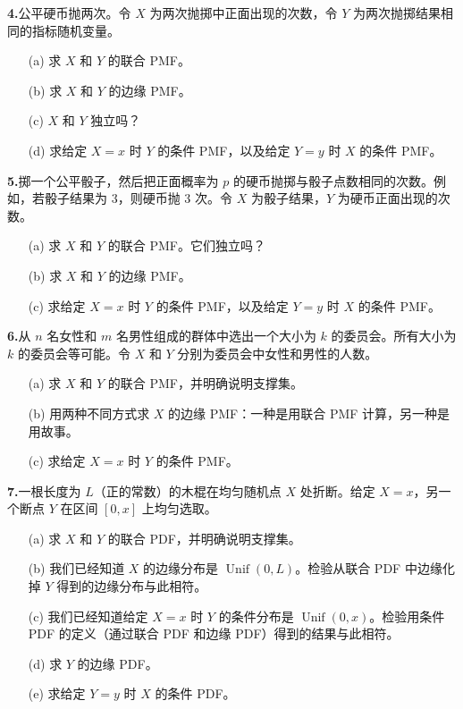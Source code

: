 \documentclass[UTF8, 12pt, fontset=fandol, oneside]{ctexart}
\begin{document}
\noindent\textbf{4.}\quad 公平硬币抛两次。令 $X$ 为两次抛掷中正面出现的次数，令 $Y$ 为两次抛掷结果相同的指标随机变量。
\begin{enumerate}
  \item[(a)] 求 $X$ 和 $Y$ 的联合 PMF。
  \item[(b)] 求 $X$ 和 $Y$ 的边缘 PMF。
  \item[(c)] $X$ 和 $Y$ 独立吗？
  \item[(d)] 求给定 $X=x$ 时 $Y$ 的条件 PMF，以及给定 $Y=y$ 时 $X$ 的条件 PMF。
\end{enumerate}

\noindent\textbf{5.}\quad 掷一个公平骰子，然后把正面概率为 $p$ 的硬币抛掷与骰子点数相同的次数。例如，若骰子结果为 3，则硬币抛 3 次。令 $X$ 为骰子结果，$Y$ 为硬币正面出现的次数。
\begin{enumerate}
  \item[(a)] 求 $X$ 和 $Y$ 的联合 PMF。它们独立吗？
  \item[(b)] 求 $X$ 和 $Y$ 的边缘 PMF。
  \item[(c)] 求给定 $X=x$ 时 $Y$ 的条件 PMF，以及给定 $Y=y$ 时 $X$ 的条件 PMF。
\end{enumerate}

\noindent\textbf{6.}\quad 从 $n$ 名女性和 $m$ 名男性组成的群体中选出一个大小为 $k$ 的委员会。所有大小为 $k$ 的委员会等可能。令 $X$ 和 $Y$ 分别为委员会中女性和男性的人数。
\begin{enumerate}
  \item[(a)] 求 $X$ 和 $Y$ 的联合 PMF，并明确说明支撑集。
  \item[(b)] 用两种不同方式求 $X$ 的边缘 PMF：一种是用联合 PMF 计算，另一种是用故事。
  \item[(c)] 求给定 $X=x$ 时 $Y$ 的条件 PMF。
\end{enumerate}

\noindent\textbf{7.}\quad 一根长度为 $L$（正的常数）的木棍在均匀随机点 $X$ 处折断。给定 $X=x$，另一个断点 $Y$ 在区间 $[0,x]$ 上均匀选取。
\begin{enumerate}
  \item[(a)] 求 $X$ 和 $Y$ 的联合 PDF，并明确说明支撑集。
  \item[(b)] 我们已经知道 $X$ 的边缘分布是 $\operatorname{Unif}(0,L)$。检验从联合 PDF 中边缘化掉 $Y$ 得到的边缘分布与此相符。
  \item[(c)] 我们已经知道给定 $X=x$ 时 $Y$ 的条件分布是 $\operatorname{Unif}(0,x)$。检验用条件 PDF 的定义（通过联合 PDF 和边缘 PDF）得到的结果与此相符。
  \item[(d)] 求 $Y$ 的边缘 PDF。
  \item[(e)] 求给定 $Y=y$ 时 $X$ 的条件 PDF。
\end{enumerate}
\end{document}
